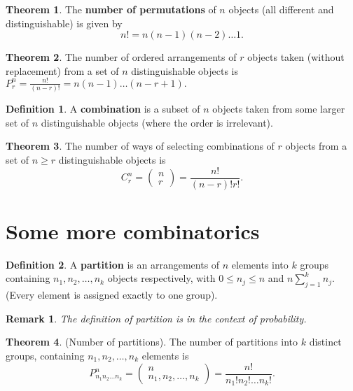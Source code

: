 \documentclass[12pt, a4paper]{article}
\newtheorem*{remark}{Remark}
\theoremstyle{definition}
\newtheorem{definition}{Definition}[section]
\newtheorem{theorem}{Theorem}[section]
\theoremstyle{plain}
\begin{document}
\begin{theorem}
The \textbf{number of permutations} of $n$ objects (all different and distinguishable) is given by $$n! = n(n-1)(n-2)\ldots1.$$
\end{theorem}

\begin{theorem}
The number of ordered arrangements of $r$ objects taken (without replacement) from a set of $n$ distinguishable objects is $P_r^n = \frac{n!}{(n-r)!}=n(n-1)\ldots(n-r+1).$
\end{theorem}

\begin{definition}
A \textbf{combination} is a subset of $n$ objects taken from some larger set of $n$ distinguishable objects (where the order is irrelevant).
\end{definition}

\begin{theorem}
The number of ways of selecting combinations of $r$ objects from a set of $n \geq r$ distinguishable objects is $$C_r^n = \begin{pmatrix} n \\ r\end{pmatrix} = \frac{n!}{(n-r)!r!}.$$
\end{theorem}

\section{Some more combinatorics}

\begin{definition}
A \textbf{partition} is an arrangements of $n$ elements into $k$ groups containing $n_1,n_2,\ldots,n_k$ objects respectively, with $0\leq n_j\leq n$ and $n \sum_{j=1}^{k} n_j.$ (Every element is assigned exactly to one group).
\end{definition}

\begin{remark}
The definition of partition is in the context of probability.
\end{remark}

\begin{theorem}
(Number of partitions). The number of partitions into $k$ distinct groups, containing $n_1,n_2,\ldots,n_k$ elements is $$P_{n_{1}n_{2}\ldots n_{k}}^{n} = \begin{pmatrix} n \\ n_1,n_2,\ldots,n_k \end{pmatrix} = \frac{n!}{n_{1}!n_{2}!\ldots n_{k}!}.$$
\end{theorem}
\end{document}
